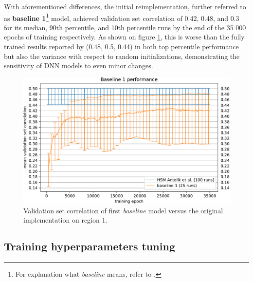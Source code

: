 With aforementioned differences, the initial reimplementation, further referred to as \textbf{baseline 1}\footnote{For explanation what \textit{baseline} means, refer to .} model, achieved validation set correlation of 0.42, 0.48, and 0.3 for its median, 90th percentile, and 10th percentile runs by the end of the 35 000 epochs of training respectively. As shown on figure \ref{fig:5.1.1.1}, this is worse than the fully trained results reported by \citeauthor{antolik} (0.48, 0.5, 0.44) in both top percentile performance but also the variance with respect to random initializations, demonstrating the sensitivity of DNN models to even minor changes.

\begin{figure}[H]
    \centering
    \includegraphics[width=1\textwidth]{../figures/05_1_1_1}
    \caption[Experiment 1.1.1]{Validation set correlation of first \textit{baseline} model versus the original \cite{antolik} implementation on region 1\protect\footnotemark.}
    \label{fig:5.1.1.1}
\end{figure}

\subsection{Training hyperparameters tuning}
